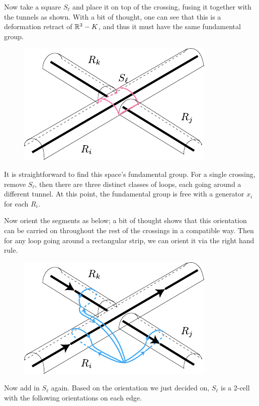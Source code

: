 \documentclass[twoside,10pt]{article}
\begin{document}
Now take a square $S_{\ell}$ and place it on top of the crossing, fusing it together with the tunnels as shown. With a bit of thought, one can see that this is a deformation retract of $\mathbb{R}^{3}-K$, and thus it must have the same fundamental group.

\begin{figure}[H]
	\centering
	\includegraphics[scale=1.5]{fig/with-square.pdf}
\end{figure}

It is straightforward to find this space's fundamental group. For a single crossing, remove $S_{\ell}$, then there are three distinct classes of loops, each going around a different tunnel. At this point, the fundamental group is free with a generator $x_i$ for each $R_i$.

Now orient the segments as below; a bit of thought shows that this orientation can be carried on throughout the rest of the crossings in a compatible way. Then for any loop going around a rectangular strip, we can orient it via the right hand rule.

\begin{figure}[H]
	\centering
	\includegraphics[scale=1.5]{fig/orient.pdf}
\end{figure}

Now add in $S_\ell$ again. Based on the orientation we just decided on, $S_\ell$ is a 2-cell with the following orientations on each edge.
\end{document}
